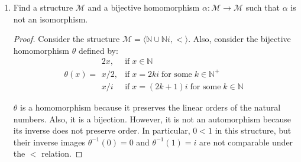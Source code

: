 \documentclass{article}
\begin{document}
\begin{enumerate}
    \begin{proof}
      $\mathcal{M}=\langle\mathbb{N},<\rangle$ is one such structure. Let
      $\alpha:\mathbb{N}\rightarrow\mathbb{N}$ be an automorphism. We show by
      induction on $n\in\mathbb{N}$ that $\alpha(n)=n$. For the base case,
      if $\alpha(0)=k>0$, then since automorphisms preserve relations, and
      $k-1<k$, we have $\alpha^{-1}(k-1)<\alpha^{-1}(k)=0$, which is not
      possible because nothing in $\mathbb{N}$ is smaller than $0$. Hence
      $\alpha(0)=0$. For the inductive step, assume $\alpha(k)=k$ for
      $k\leq n\in\mathbb{N}$. If $\alpha(n+1)=n+1+k$ for some $k>0$, then
      from $n+1<n+1+k$, we get, from the preservation of relations, that
      $\alpha^{-1}(n+1)<\alpha^{-1}(n+1+k)=n+1$. Yet $\alpha^{-1}(n+1)$
      must be greater than $n+1$ from inductive hypothesis, which is a
      contradiction. Hence $\alpha(n+1)=n+1$ as required, and $\alpha$ can
      only be the identity map.
    \end{proof}

  \item Find a structure $\mathcal{M}$ and a bijective homomorphism
    $\alpha:\mathcal{M}\rightarrow\mathcal{M}$ such that $\alpha$ is not an
    isomorphism.

    \begin{proof}
      Consider the structure
      $\mathcal{M}=\langle\mathbb{N}\cup\mathbb{N}i,<\rangle$.  Also,
      consider the bijective homomorphism $\theta$ defined by:
      \begin{equation*}
        \theta(x) =
          \begin{array}{ll}
            2x,   & \text{if}\; x\in\mathbb{N} \\
            x/2,  & \text{if}\; x=2ki\; \text{for some}\; k\in\mathbb{N}^+ \\
            x/i   & \text{if}\; x=(2k+1)i\; \text{for some}\; k\in\mathbb{N}
          \end{array}
      \end{equation*}

      $\theta$ is a homomorphism because it preserves the linear orders of
      the natural numbers. Also, it is a bijection. However, it is not an
      automorphism because its inverse does not preserve order. In
      particular, $0<1$ in this structure, but their inverse images
      $\theta^{-1}(0)=0$ and $\theta^{-1}(1)=i$ are not comparable under
      the $<$ relation.
    \end{proof}
\end{enumerate}
\end{document}
